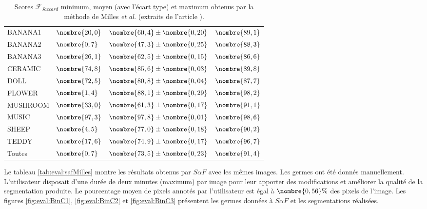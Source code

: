 \begin{table}[htb]
\caption{Scores  $\mathcal{F}_{Jaccard}$ minimum, moyen (avec l'écart type) et maximum obtenus par la méthode de Milles \textit{et al.} (extraits de l'article \cite{mille2015combination}).}
\centering
\begin{tabular}{|l|l| l|l|}
\hline
\cellcolor{gris}{Nom de l'image} & \cellcolor{gris}{Minimum} & \cellcolor{gris}{Moyenne}  & \cellcolor{gris}{Maximum}  \\
\hline
BANANA1 & $\nombre{20,0}$ &$\nombre{60,4} \pm \nombre{0,20} $&$\nombre{89,1}$ \\ 
\hline
BANANA2 & $\nombre{0,7}$&$\nombre{47,3} \pm \nombre{0,25}$ &$\nombre{88,3}$  \\
\hline
BANANA3& $\nombre{26,1}$ & $\nombre{62,5} \pm \nombre{0,15}$ &$\nombre{86,6}$\\
\hline
CERAMIC & $\nombre{74,8}$& $\nombre{85,6} \pm \nombre{0,03}$ &$\nombre{89,8}$ \\
\hline
DOLL & $\nombre{72,5}$& $\nombre{80,8} \pm \nombre{0,04}$ &$\nombre{87,7}$  \\
\hline
FLOWER & $\nombre{1,4}$ &$\nombre{88,1} \pm \nombre{0,29}$ &$\nombre{98,2}$ \\
\hline
MUSHROOM & $\nombre{33,0}$ & $\nombre{61,3} \pm \nombre{0,17}$ &$\nombre{91,1}$ \\
\hline
MUSIC & $\nombre{97,3}$ & $\nombre{97,8} \pm \nombre{0,01}$&$\nombre{98,6}$ \\
\hline
SHEEP & $\nombre{4,5}$ & $\nombre{77,0} \pm \nombre{0,18}$&$\nombre{90,2}$ \\
\hline
TEDDY &$\nombre{17,6}$  & $\nombre{74,9} \pm \nombre{0,17}$&$\nombre{96,7}$ \\
\hline
Toutes & $\nombre{0,7}$ & $\nombre{73,5} \pm \nombre{0,23}$&  $\nombre{91,4}$\\
\hline
\end{tabular}
\label{eval:tab:resMilles}
\end{table}

Le tableau \ref{tab:eval:safMilles} montre les résultats obtenus par $S \alpha F$ avec les mêmes images. Les germes ont été donnés manuellement. L'utilisateur disposait d'une durée de deux minutes (maximum) par image pour leur apporter des modifications et améliorer la qualité de la segmentation produite. Le pourcentage moyen de pixels annotés par l'utilisateur est égal à $\nombre{0,56} \%$ des pixels de l'image. Les figures \ref{fig:eval:BinC1}, \ref{fig:eval:BinC2} et \ref{fig:eval:BinC3} présentent les germes données à $S \alpha F$  et les segmentations réalisées. 

